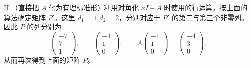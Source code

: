 \begin{enumerate}[label=(\arabic*)]
\noindent II.（直接把 $A$ 化为有理标准形）利用对角化 $xI-A$ 时使用的行运算，按上面的算法确定矩阵 $P'$。这里 $d_1=1,d_2=2$，分别对应于 $P'$ 的第二与第三个非零列。因此 $P$ 的列分别为
\[
\begin{pmatrix}-7\\7\\1\end{pmatrix},
\qquad
\begin{pmatrix}-1\\1\\0\end{pmatrix},
\qquad
A\begin{pmatrix}-1\\1\\0\end{pmatrix}=\begin{pmatrix}-4\\3\\0\end{pmatrix},
\]
从而再次得到上面的矩阵 $P$。


\end{enumerate}
